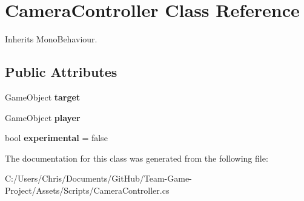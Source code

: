 \hypertarget{class_camera_controller}{}\section{Camera\+Controller Class Reference}
\label{class_camera_controller}


Inherits Mono\+Behaviour.

\subsection*{Public Attributes}
\begin{DoxyCompactItemize}
\item 
Game\+Object {\bfseries target}\hypertarget{class_camera_controller_a2a671c90de07af1a4f8b7530268e9f3a}{}\label{class_camera_controller_a2a671c90de07af1a4f8b7530268e9f3a}

\item 
Game\+Object {\bfseries player}\hypertarget{class_camera_controller_aae794ec2d17947f671ce0eaef9aac8b7}{}\label{class_camera_controller_aae794ec2d17947f671ce0eaef9aac8b7}

\item 
bool {\bfseries experimental} = false\hypertarget{class_camera_controller_a3bf01b53e04f17060497fe29a1b5178a}{}\label{class_camera_controller_a3bf01b53e04f17060497fe29a1b5178a}

\end{DoxyCompactItemize}


The documentation for this class was generated from the following file\+:\begin{DoxyCompactItemize}
\item 
C\+:/\+Users/\+Chris/\+Documents/\+Git\+Hub/\+Team-\/\+Game-\/\+Project/\+Assets/\+Scripts/Camera\+Controller.\+cs\end{DoxyCompactItemize}
